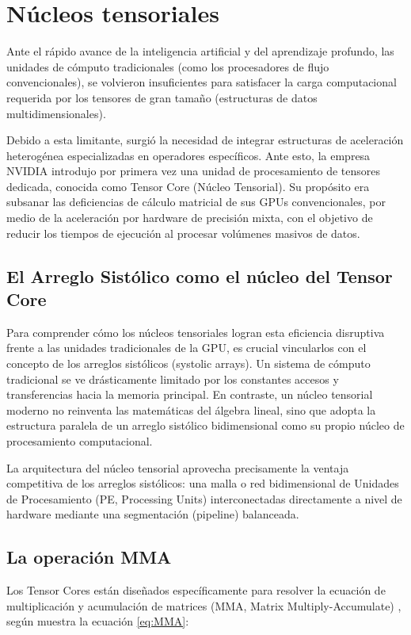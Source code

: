 \documentclass[conference]{IEEEtran}
\begin{document}
\section{Núcleos tensoriales}
Ante el rápido avance de la inteligencia artificial y del aprendizaje profundo, 
las unidades de cómputo tradicionales (como los procesadores de flujo convencionales),
se volvieron insuficientes para satisfacer la carga computacional requerida por 
los tensores de gran tamaño (estructuras de datos multidimensionales).

Debido a esta limitante, surgió la necesidad de integrar estructuras de aceleración heterogénea
especializadas en operadores específicos. Ante esto, la empresa NVIDIA introdujo por primera
vez una unidad de procesamiento de tensores dedicada, conocida como Tensor Core (Núcleo Tensorial).
Su propósito era subsanar las deficiencias de cálculo matricial de sus GPUs convencionales, por medio de 
la aceleración por hardware de precisión mixta, con el objetivo de reducir los tiempos de ejecución
al procesar volúmenes masivos de datos. 

\subsection{El Arreglo Sistólico como el núcleo del Tensor Core}
Para comprender cómo los núcleos tensoriales logran esta eficiencia disruptiva frente a las unidades 
tradicionales de la GPU, es crucial vincularlos con el concepto de los arreglos sistólicos (systolic arrays). 
Un sistema de cómputo tradicional se ve drásticamente limitado por los constantes accesos y transferencias 
hacia la memoria principal. En contraste, un núcleo tensorial moderno no reinventa las matemáticas del álgebra lineal, 
sino que adopta la estructura paralela de un arreglo sistólico bidimensional como su propio núcleo de procesamiento computacional.

La arquitectura del núcleo tensorial aprovecha precisamente la ventaja competitiva de los arreglos sistólicos: una malla 
o red bidimensional de Unidades de Procesamiento (PE, Processing Units) interconectadas directamente a nivel de 
hardware mediante una segmentación (pipeline) balanceada.

\subsection{La operación MMA}
Los Tensor Cores están diseñados específicamente para resolver la ecuación de multiplicación
y acumulación de matrices (MMA, Matrix Multiply-Accumulate) \cite{feng2025tensor}, según muestra la ecuación \ref{eq:MMA}:
\end{document}
